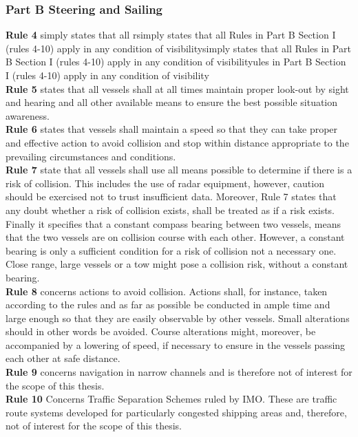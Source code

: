 \subsubsection{Part B Steering and Sailing}
\textbf{Rule 4} simply states that all rsimply states that all Rules in Part B Section I (rules 4-10) apply in any condition of visibilitysimply states that all Rules in Part B Section I (rules 4-10) apply in any condition of visibilityules in Part B Section I (rules 4-10) apply in any condition of visibility
\\
\textbf{Rule 5} states that all vessels shall at all times maintain proper look-out by sight and hearing and all other available means to ensure the best possible situation awareness.
\\
\textbf{Rule 6} states that vessels shall maintain a speed so that they can take proper and effective action to avoid collision and stop within distance appropriate to the prevailing circumstances and conditions.
\\
\textbf{Rule 7} state that all vessels shall use all means possible to determine if there is a risk of collision.
This includes the use of radar equipment, however, caution should be exercised not to trust insufficient data.
Moreover, Rule 7 states that any doubt whether a risk of collision exists, shall be treated as if a risk exists.
Finally it specifies that a constant compass bearing between two vessels, means that the two vessels are on collision course with each other.
However, a constant bearing is only a sufficient condition for a risk of collision not a necessary one.
Close range, large vessels or a tow might pose a collision risk, without a constant bearing.
\\
\textbf{Rule 8} concerns actions to avoid collision. Actions shall, for instance, taken according to the rules and as far as possible be conducted in ample time and large enough so that they are easily observable by other vessels. Small alterations should in other words be avoided. Course alterations might, moreover, be accompanied by a lowering of speed, if necessary to ensure in the vessels passing each other at safe distance.
\\
\textbf{Rule 9} concerns navigation in narrow channels and is therefore not of interest for the scope of this thesis.
\\
\textbf{Rule 10} Concerns Traffic Separation Schemes ruled by IMO. These are traffic route systems developed for particularly congested shipping areas \cite{ships_routing_imo} and, therefore, not of interest for the scope of this thesis.

